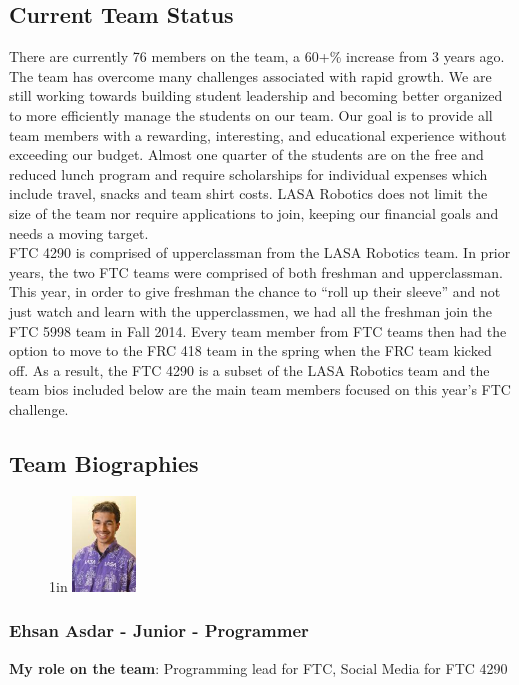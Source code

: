\clearpage
\newpage

\subsection{Current Team Status}
There are currently 76 members on the team, a 60+\% increase from 3 years ago. The team has overcome many challenges associated with rapid growth.  We are still working towards building student leadership and becoming better organized to more efficiently manage the students on our team.  Our goal is to provide all team members with a rewarding, interesting, and educational experience without exceeding our budget. Almost one quarter of the students are on the free and reduced lunch program and require scholarships for individual expenses which include travel, snacks and team shirt costs. LASA Robotics does not limit the size of the team nor require applications to join, keeping our financial goals and needs a moving target.\\

FTC 4290 is comprised of upperclassman from the LASA Robotics team.  In prior years, the two FTC teams were comprised of both freshman and upperclassman.  This year, in order to give freshman the chance to “roll up their sleeve” and not just watch and learn with the upperclassmen, we had all the freshman join the FTC 5998 team in Fall 2014.  Every team member from FTC teams then had the option to move to the FRC 418 team in the spring when the FRC team kicked off.  As a result, the FTC 4290 is a subset of the LASA Robotics team and the team bios included below are the main team members focused on this year’s FTC challenge.\\

\clearpage
\newpage

\subsection{Team Biographies}
\begin{figure}[H]{1in}
	\centering
	\includegraphics[height=1in]{ehsan}
\end{figure}
\subsubsection{Ehsan Asdar - Junior - Programmer} 
{\bf My role on the team}: Programming lead for FTC, Social Media for FTC 4290

